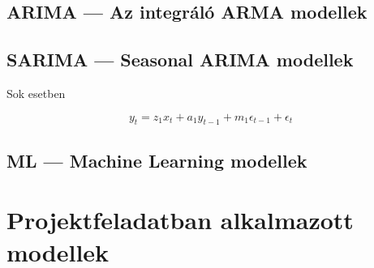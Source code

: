 \subsection{ARIMA --- Az integráló ARMA modellek}
\subsection{SARIMA --- Seasonal ARIMA modellek}

Sok esetben

\begin{equation}
    y_t = z_1x_t + a_1y_{t-1} + m_1\epsilon_{t-1} + \epsilon_t
\end{equation}

\subsection{ML --- Machine Learning modellek}

\section{Projektfeladatban alkalmazott modellek}